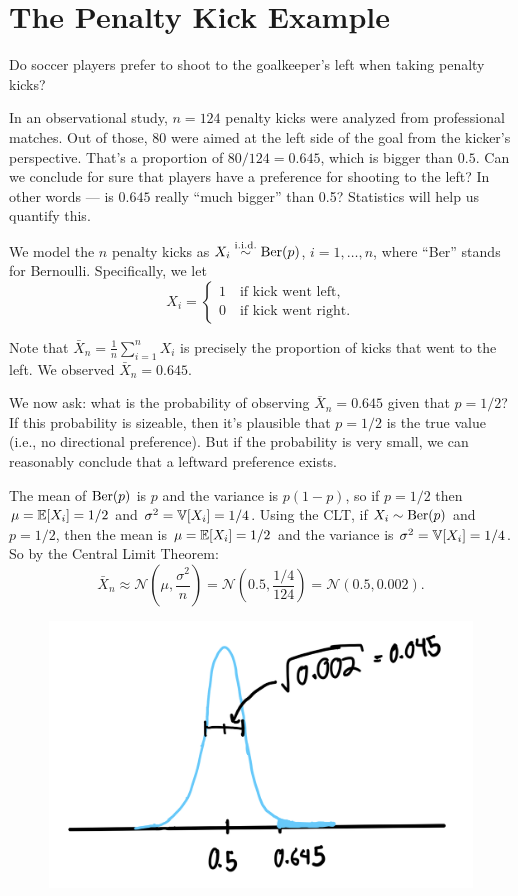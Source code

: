 \documentclass[11pt]{article}
\begin{document}
\section{The Penalty Kick Example}\label{sec:penalty}

Do soccer players prefer to shoot to the goalkeeper's left when taking penalty kicks?

In an observational study, $n=124$ penalty kicks were analyzed from professional matches. Out of those, 80 were aimed at the left side of the goal from the kicker's perspective. That's a proportion of $80/124=0.645$, which is bigger than $0.5$. Can we conclude for sure that players have a preference for shooting to the left? In other words — is $0.645$ really “much bigger” than 0.5? Statistics will help us quantify this.

We model the $n$ penalty kicks as $X_i \stackrel{\mathrm{i.i.d.}}{\sim} \mathrm{Ber}(p)$, $i=1,\dots,n$, where “Ber” stands for Bernoulli. Specifically, we let
\[
X_i = \begin{cases}
1 \quad \text{if kick went left},\\
0 \quad \text{if kick went right}.
\end{cases}
\]

Note that $\bar X_n = \frac{1}{n} \sum_{i=1}^n X_i$ is precisely the proportion of kicks that went to the left. We observed $\bar X_n = 0.645$.

\noindent We now ask: what is the probability of observing $\bar X_n = 0.645$ given that $p = 1/2$? If this probability is sizeable, then it's plausible that $p = 1/2$ is the true value (i.e., no directional preference). But if the probability is very small, we can reasonably conclude that a leftward preference exists.

The mean of $\mathrm{Ber}(p)$ is $p$ and the variance is $p(1-p)$, so if $p=1/2$ then $\mu=\mathbb E[X_i]=1/2$ and $\sigma^2=\mathbb V[X_i]=1/4$. Using the CLT, if $X_i \sim \mathrm{Ber}(p)$ and $p=1/2$, then the mean is $\mu = \mathbb E[X_i] = 1/2$ and the variance is $\sigma^2 = \mathbb V[X_i] = 1/4$. So by the Central Limit Theorem:
\[
\bar X_n \approx \mathcal N\left(\mu, \frac{\sigma^2}{n}\right) = \mathcal N\left(0.5, \frac{1/4}{124}\right) = \mathcal N(0.5, 0.002).
\]

\begin{figure}[h]
    \centering
    \includegraphics[scale=0.1]{figures/density.png}
\end{figure}
\end{document}
